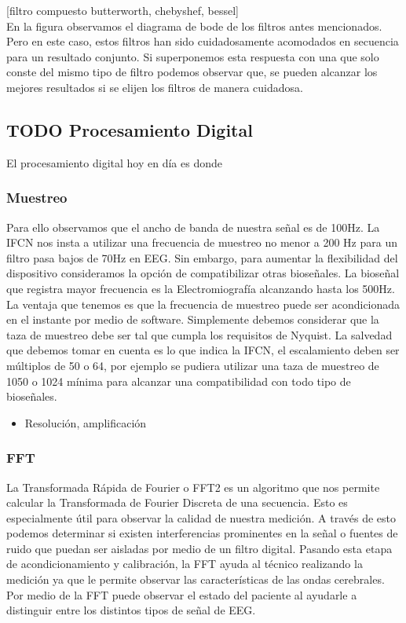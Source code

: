 [filtro compuesto butterworth, chebyshef, bessel]\\

En la figura observamos el diagrama de bode de los filtros antes mencionados. Pero en este caso, estos filtros han sido cuidadosamente acomodados en secuencia para un resultado conjunto. Si superponemos esta respuesta con una que solo conste del mismo tipo de filtro podemos observar que, se pueden alcanzar los mejores resultados si se elijen los filtros de manera cuidadosa.\\

\subsection{{\bfseries\sffamily TODO} Procesamiento Digital}
\label{sec:orgeed4231}
El procesamiento digital hoy en día es donde\\
\subsubsection{Muestreo}
\label{sec:orgfaa9136}
Para ello observamos que el ancho de banda de nuestra señal es de 100Hz. La IFCN nos insta a utilizar una frecuencia de muestreo no menor a 200 Hz para un filtro pasa bajos de 70Hz en EEG. Sin embargo, para aumentar la flexibilidad del dispositivo consideramos la opción de compatibilizar otras bioseñales. La bioseñal que registra mayor frecuencia es la Electromiografía alcanzando hasta los 500Hz. La ventaja que tenemos es que la frecuencia de muestreo puede ser acondicionada en el instante por medio de software. Simplemente debemos considerar que la taza de muestreo debe ser tal que cumpla los requisitos de Nyquist. La salvedad que debemos tomar en cuenta es lo que indica la IFCN, el escalamiento deben ser múltiplos de 50 o 64, por ejemplo se pudiera utilizar una taza de muestreo de 1050 o 1024 mínima para alcanzar una compatibilidad con todo tipo de bioseñales.\\
\begin{itemize}
\item Resolución, amplificación\\
\end{itemize}
\subsubsection{FFT}
\label{sec:orgc86447d}
La Transformada Rápida de Fourier o FFT2 es un algoritmo que nos permite calcular la Transformada de Fourier Discreta de una secuencia. Esto es especialmente útil para observar la calidad de nuestra medición. A través de esto podemos determinar si existen interferencias prominentes en la señal o fuentes de ruido que puedan ser aisladas por medio de un filtro digital. Pasando esta etapa de acondicionamiento y calibración, la FFT ayuda al técnico realizando la medición ya que le permite observar las características de las ondas cerebrales. Por medio de la FFT puede observar el estado del paciente al ayudarle a distinguir entre los distintos tipos de señal de EEG.\\

